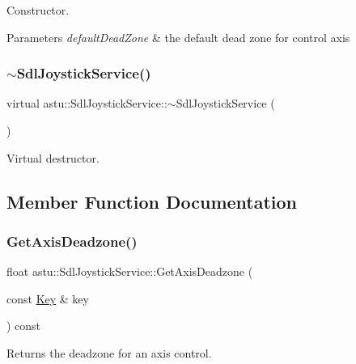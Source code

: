 Constructor.


\begin{DoxyParams}{Parameters}
{\em default\+Dead\+Zone} & the default dead zone for control axis \\
\hline
\end{DoxyParams}
\mbox{\label{classastu_1_1SdlJoystickService_ae30060b4090e8a16b0cc73596d923ce0}} 
\subsubsection{\texorpdfstring{$\sim$\+Sdl\+Joystick\+Service()}{~SdlJoystickService()}}
{\footnotesize\ttfamily virtual astu\+::\+Sdl\+Joystick\+Service\+::$\sim$\+Sdl\+Joystick\+Service (\begin{DoxyParamCaption}{ }\end{DoxyParamCaption})\hspace{0.3cm}{\ttfamily [virtual]}}

Virtual destructor. 

\subsection{Member Function Documentation}
\mbox{\label{classastu_1_1SdlJoystickService_a4f0681331183b7744e8cf78f6ddb4da4}} 
\subsubsection{\texorpdfstring{Get\+Axis\+Deadzone()}{GetAxisDeadzone()}}
{\footnotesize\ttfamily float astu\+::\+Sdl\+Joystick\+Service\+::\+Get\+Axis\+Deadzone (\begin{DoxyParamCaption}\item[{const \hyperlink{classastu_1_1Key}{Key} \&}]{key }\end{DoxyParamCaption}) const}

Returns the deadzone for an axis control.

